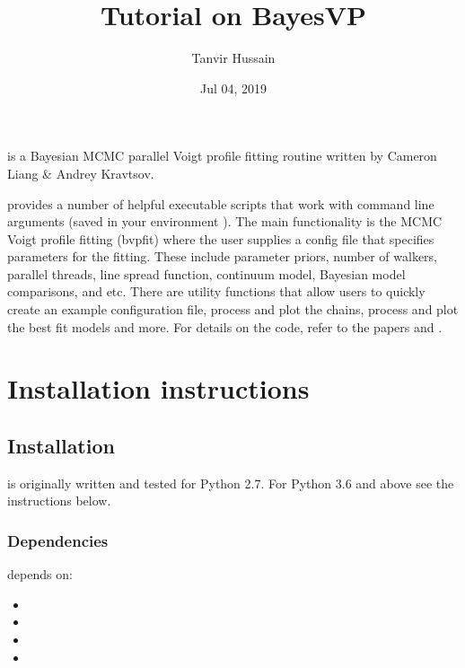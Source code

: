 \documentclass[a4paper,11pt,english]{sphinxmanual}
\title{Tutorial on BayesVP}
\date{Jul 04, 2019}
\author{Tanvir Hussain}
\begin{document}
\pagestyle{empty}
\maketitle
\pagestyle{plain}
\sphinxtableofcontents
\pagestyle{normal}
\label{\detokenize{index::doc}}


 is a Bayesian MCMC parallel Voigt profile fitting routine written by Cameron Liang \& Andrey Kravtsov.

 provides a number of helpful executable scripts that work with command line arguments (saved in your environment ). The
main functionality is the MCMC Voigt profile fitting (bvpfit) where the user supplies a config file that specifies parameters for the fitting.
These include parameter priors, number of walkers, parallel threads, line spread function, continuum model, Bayesian model comparisons, and
etc. There are utility functions that allow users to quickly create an example configuration file, process and plot the chains, process and plot the best fit models and more. For details on the code, refer to the papers  and .


\chapter{Installation instructions}
\label{\detokenize{index:installation-instructions}}

\section{Installation}
\label{\detokenize{install:installation}}\label{\detokenize{install:install}}\label{\detokenize{install::doc}}
 is originally written and tested for Python 2.7. For Python 3.6 and above see the instructions below.


\subsection{Dependencies}
\label{\detokenize{install:dependencies}}
 depends on:
\begin{itemize}
\item {} 

\item {} 

\item {} 

\item {} 

\end{itemize}
\end{document}
